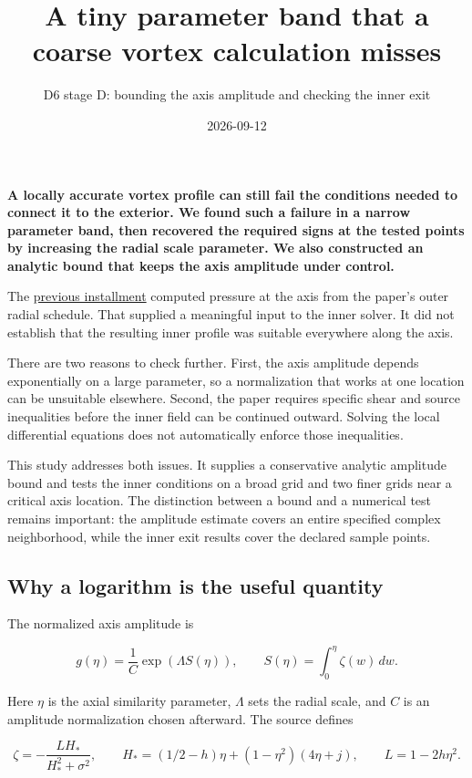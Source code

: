 \documentclass[
  english,
  11pt,
]{article}
\title{A tiny parameter band that a coarse vortex calculation misses}
\subtitle{D6 stage D: bounding the axis amplitude and checking the inner
exit}
\author{}
\date{2026-09-12}
\begin{document}
\maketitle


\textbf{A locally accurate vortex profile can still fail the conditions
needed to connect it to the exterior. We found such a failure in a
narrow parameter band, then recovered the required signs at the tested
points by increasing the radial scale parameter. We also constructed an
analytic bound that keeps the axis amplitude under control.}

The \href{../d6_axis_pressure/article.html}{previous installment}
computed pressure at the axis from the paper's outer radial schedule.
That supplied a meaningful input to the inner solver. It did not
establish that the resulting inner profile was suitable everywhere along
the axis.

There are two reasons to check further. First, the axis amplitude
depends exponentially on a large parameter, so a normalization that
works at one location can be unsuitable elsewhere. Second, the paper
requires specific shear and source inequalities before the inner field
can be continued outward. Solving the local differential equations does
not automatically enforce those inequalities.

This study addresses both issues. It supplies a conservative analytic
amplitude bound and tests the inner conditions on a broad grid and two
finer grids near a critical axis location. The distinction between a
bound and a numerical test remains important: the amplitude estimate
covers an entire specified complex neighborhood, while the inner exit
results cover the declared sample points.

\subsection{Why a logarithm is the useful
quantity}\label{why-a-logarithm-is-the-useful-quantity}

The normalized axis amplitude is

\[
g(\eta)=\frac{1}{C}\exp\!\left(\Lambda S(\eta)\right),
\qquad
S(\eta)=\int_0^\eta\zeta(w)\,dw.
\]

Here \(\eta\) is the axial similarity parameter, \(\Lambda\) sets the
radial scale, and \(C\) is an amplitude normalization chosen afterward.
The source defines

\[
\zeta=-\frac{LH_*}{H_*^2+\sigma^2},\qquad
H_*=(1/2-h)\eta+(1-\eta^2)(4\eta+j),\qquad
L=1-2h\eta^2.
\]
\end{document}
